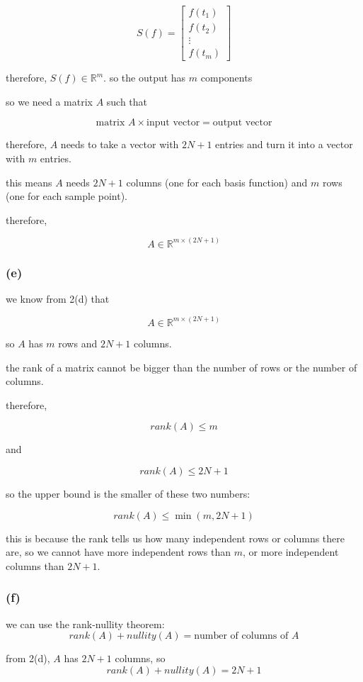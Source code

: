 \documentclass{article}
\begin{document}
\[
S(f) =
\begin{bmatrix}
    f(t_1)\\
    f(t_2)\\
    \vdots\\
    f(t_m)
\end{bmatrix}
\]

therefore, $S(f) \in \mathbb{R}^m$. so the output has $m$ components

so we need a matrix $A$ such that

\[
\text{matrix }A \times \text{input vector} = \text{output vector}
\]

therefore, $A$ needs to take a vector with $2N+1$ entries and turn it into a vector with $m$ entries.

this means $A$ needs $2N+1$ columns (one for each basis function) and $m$ rows (one for each sample point).

therefore,

\[
\boxed{A\in\mathbb{R}^{m\times(2N+1)}}
\]

\subsubsection*{(e)}
we know from 2(d) that

\[
A\in\mathbb{R}^{m\times(2N+1)}
\]

so $A$ has $m$ rows and $2N+1$ columns.

the rank of a matrix cannot be bigger than the number of rows or the number of columns.

therefore,

\[
rank(A)\leq m
\]

and

\[
rank(A)\leq 2N+1
\]

so the upper bound is the smaller of these two numbers:

\[
\boxed{rank(A)\leq\min(m,2N+1)}
\]

this is because the rank tells us how many independent rows or columns there are, so we cannot have more independent rows than $m$, or more independent columns than $2N+1$.

\subsubsection*{(f)}
we can use the rank-nullity theorem:
\[
rank(A)+nullity(A)=\text{number of columns of }A
\]

from 2(d), $A$ has $2N+1$ columns, so
\[
rank(A)+nullity(A)=2N+1
\]
\end{document}
